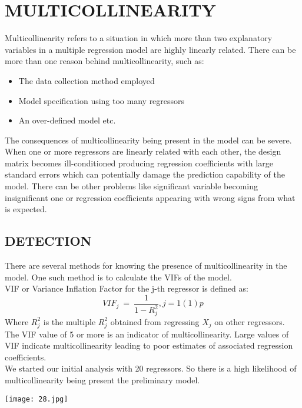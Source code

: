 \documentclass[a4paper,12pt,twoside]{book}
\begin{document}
\section{MULTICOLLINEARITY}
Multicollinearity refers to a situation in which more than two explanatory variables in a multiple regression model are highly linearly related. There can be more than one reason behind multicollinearity, such as:
\begin{itemize}
\item The data collection method employed\\
\item Model specification using too many regressors\\
\item An over-defined model etc.\\
\end{itemize}
The consequences of multicollinearity being present in the model can be severe. When one or more regressors are linearly related with each other, the design matrix becomes ill-conditioned producing regression coefficients with large standard errors which can potentially damage the prediction capability of the model. There can be other problems like significant variable becoming insignificant one or regression coefficients appearing with wrong signs from what is expected.
\subsection*{DETECTION}
There are several methods for knowing the presence of multicollinearity in the model. One such method is to calculate the VIFs of the model.\\
VIF or Variance Inflation Factor for the j-th regressor is defined as:\\
\[VIF_j\:=\:\frac{1}{1-R_j^2}, j=1(1)p\]
Where $R_j^2$ is the multiple $R_j^2$ obtained from regressing $X_j$ on other regressors. The VIF value of 5 or more is an indicator of multicollinearity. Large values of VIF indicate multicollinearity leading to poor estimates of associated regression coefficients.\\
We started our initial analysis with 20 regressors. So there is a high likelihood of multicollinearity being present the preliminary model.
\begin{center}
\texttt{[image: 28.jpg]}\\
\end{center}
\end{document}
